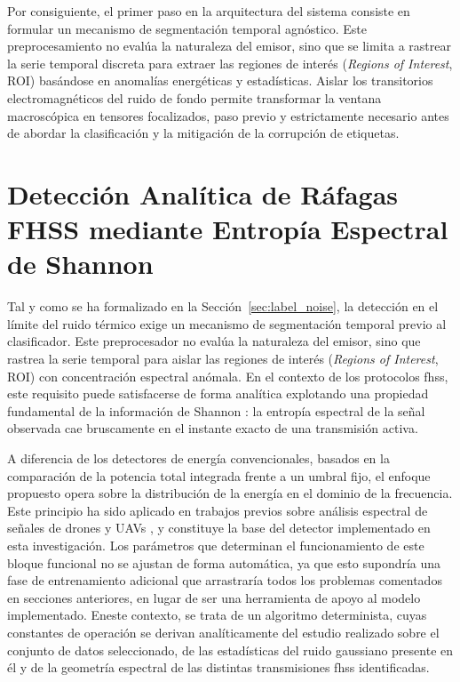 Por consiguiente, el primer paso en la arquitectura del sistema consiste en formular un mecanismo de segmentación temporal agnóstico. Este preprocesamiento no evalúa la naturaleza del emisor, sino que se limita a rastrear la serie temporal discreta para extraer las regiones de interés (\textit{Regions of Interest}, ROI) basándose en anomalías energéticas y estadísticas. Aislar los transitorios electromagnéticos del ruido de fondo permite transformar la ventana macroscópica en tensores focalizados, paso previo y estrictamente necesario antes de abordar la clasificación y la mitigación de la corrupción de etiquetas.

\section{Detección Analítica de Ráfagas FHSS mediante Entropía Espectral de Shannon}
\label{sec:detector_entropia}

Tal y como se ha formalizado en la Sección~\ref{sec:label_noise}, la detección en el límite del ruido térmico exige un mecanismo de segmentación temporal previo al clasificador. Este preprocesador no evalúa la naturaleza del emisor, sino que rastrea la serie temporal para aislar las regiones de interés (\textit{Regions of Interest}, ROI) con concentración espectral anómala. En el contexto de los protocolos \gls{fhss}, este requisito puede satisfacerse de forma analítica explotando una propiedad fundamental de la información de Shannon \cite{zhang_entropy-based_1989}: la entropía espectral de la señal observada cae bruscamente en el instante exacto de una transmisión activa.

A diferencia de los detectores de energía convencionales, basados en la comparación de la potencia total integrada frente a un umbral fijo, el enfoque propuesto opera sobre la distribución de la energía en el dominio de la frecuencia. Este principio ha sido aplicado en trabajos previos sobre análisis espectral de señales de drones y UAVs \cite{morge-rollet_drone_2022, li_dim_2025}, y constituye la base del detector implementado en esta investigación. Los parámetros que determinan el funcionamiento de este bloque funcional no se ajustan de forma automática, ya que esto supondría una fase de entrenamiento adicional que arrastraría todos los problemas comentados en secciones anteriores, en lugar de ser una herramienta de apoyo al modelo implementado. Eneste contexto, se trata de un algoritmo determinista, cuyas constantes de operación se derivan analíticamente del estudio realizado sobre el conjunto de datos seleccionado, de las estadísticas del ruido gaussiano presente en él y de la geometría espectral de las distintas transmisiones \gls{fhss} identificadas.

